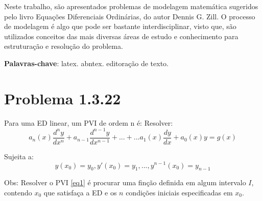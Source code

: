 \documentclass[
	article,			%
	11pt,				%
	oneside,			%
	a4paper,			%
	english,			%
	brazil,				%
	sumario=tradicional
	]{abntex2}
\begin{document}

\frenchspacing 


%
%
\maketitle

\begin{resumoumacoluna}
Neste trabalho, são apresentados problemas de modelagem matemática sugeridos pelo livro Equações Diferenciais Ordinárias, do autor Dennis G. Zill. O processo de modelagem é algo que pode ser bastante interdisciplinar, visto que, são utilizados conceitos das mais diversas áreas de estudo e conhecimento para estruturação e resolução do problema.
 
 \vspace{\onelineskip}
 
 \noindent
 \textbf{Palavras-chave}: latex. abntex. editoração de texto.
\end{resumoumacoluna}

\textual

\section{Problema 1.3.22}
Para uma ED linear, um PVI de ordem n é:
Resolver:
\begin{equation*}
a_{n}(x) \frac{d^{n}y}{dx^{n}} + a_{n-1} \frac{d^{n-1}y}{dx^{n-1}} + ... + ... a_{1}(x) \frac{dy}{dx} + a_{0}(x)y = g(x)
\end{equation*}

Sujeita a:
\begin{equation}\label{eq1}
y(x_{0}) = y_{0}, y'(x_{0}) = y_{1}, ... , y^{n-1}(x_{0}) = y_{n-1} 
\end{equation}

Obs: Resolver o PVI \eqref{eq1} é procurar uma finção definida em algum intervalo $I$, contendo $x_{0}$ que satisfaça a ED e os $n$ condições iniciais especificadas em $x_{0}$.
\end{document}
